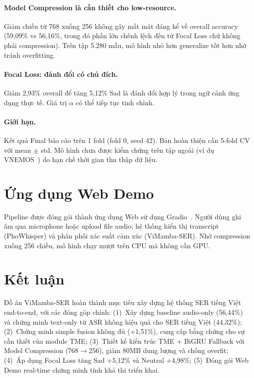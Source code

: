 \documentclass[runningheads]{llncs}
\begin{document}
\paragraph{Model Compression là cần thiết cho low-resource.}
Giảm chiều từ 768 xuống 256 không gây mất mát đáng kể về overall accuracy
(59,09\% vs 56,16\%, trong đó phần lớn chênh lệch đến từ Focal Loss chứ
không phải compression). Trên tập 5.280 mẫu, mô hình nhỏ hơn generalize
tốt hơn nhờ tránh overfitting.

\paragraph{Focal Loss: đánh đổi có chủ đích.}
Giảm 2,93\% overall để tăng 5,12\% Sad là đánh đổi hợp lý trong ngữ cảnh
ứng dụng thực tế. Giá trị $\alpha$ có thể tiếp tục tinh chỉnh.

\paragraph{Giới hạn.}
Kết quả Final báo cáo trên 1 fold (fold 0, seed 42). Bản hoàn thiện cần
5-fold CV với mean $\pm$ std. Mô hình chưa được kiểm chứng trên tập ngoài
(ví dụ VNEMOS~\cite{vnemos2024}) do hạn chế thời gian thu thập dữ liệu.

\section{Ứng dụng Web Demo}
\label{sec:demo}

Pipeline được đóng gói thành ứng dụng Web sử dụng Gradio~\cite{gradio2019}.
Người dùng ghi âm qua microphone hoặc upload file audio; hệ thống hiển thị
transcript (PhoWhisper) và phân phối xác suất cảm xúc (ViMamba-SER).
Nhờ compression xuống 256 chiều, mô hình chạy mượt trên CPU mà không cần GPU.

\section{Kết luận}
\label{sec:conclusion}

Đồ án ViMamba-SER hoàn thành mục tiêu xây dựng hệ thống SER tiếng Việt
end-to-end, với các đóng góp chính:
(1)~Xây dựng baseline audio-only (56,44\%) và chứng minh text-only từ ASR
không hiệu quả cho SER tiếng Việt (44,32\%);
(2)~Chứng minh simple fusion không đủ (+1,51\%), cung cấp bằng chứng cho
sự cần thiết của module TME;
(3)~Thiết kế kiến trúc TME + BiGRU Fallback với Model Compression
(768$\to$256), giảm 80MB dung lượng và chống overfit;
(4)~Áp dụng Focal Loss tăng Sad +5,12\% và Neutral +4,98\%;
(5)~Đóng gói Web Demo real-time chứng minh tính khả thi triển khai.
\end{document}
